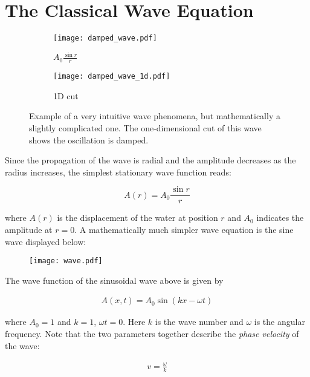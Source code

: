 \section{The Classical Wave Equation}

\begin{figure}[H]
\begin{subfigure}[b]{.59\linewidth}
\centering
\texttt{[image: damped\_wave.pdf]}
\caption{$A_0 \frac{\sin r}{r}$}\label{fig1a}
\end{subfigure}\hfill
\begin{subfigure}[b]{.39\linewidth}
\centering
\texttt{[image: damped\_wave\_1d.pdf]}
\caption{1D cut}\label{fig1b}
\end{subfigure}%
\caption{Example of a very intuitive wave phenomena, but mathematically
a slightly complicated one. The one-dimensional cut of this wave shows the
oscillation is damped.}
\end{figure}

Since the propagation of the wave is radial and the amplitude decreases as the
radius increases, the simplest stationary wave function reads: 

\[
  A(r) = A_0 \frac{\sin r}{r}
\] \vspace{3px}

where $A(r)$ is the displacement of the water at position $r$ and $A_0$
indicates the amplitude at $r=0$. A mathematically much simpler wave equation
is the sine wave displayed below: 


\begin{figure}[H]
  \centering
    \texttt{[image: wave.pdf]}
\end{figure}

The wave function of the sinusoidal wave above is given by

\begin{align} \label{eq:1}
A(x, t) = A_0 \sin (kx - \omega t)
\end{align}
\vspace{3px}

where $A_0 = 1$ and $k = 1$, $\omega t = 0$. Here $k$ is the wave number and
$\omega$ is the angular frequency. Note that the two parameters together
describe the \textit{phase velocity} of the wave: 

\begin{align} \label{eq:2}
  v = \frac{\omega}{k}
\end{align}\vspace{3px}

